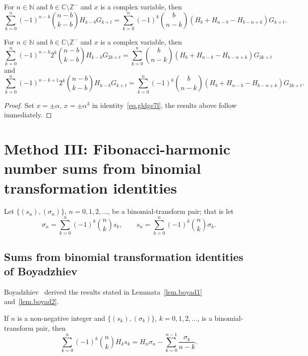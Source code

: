 \documentclass[12pt,reqno]{article}
\begin{document}
	\begin{theorem}
	For $n\in \mathbb{N}$ and $b\in \mathbb{C}\setminus\mathbb{Z}^{-}$ and $x$ is a complex variable, then
	\begin{equation}\label{today56}
	\sum_{k=0}^n (-1)^{n-k} \binom{n-b}{k-b} H_{k-b} G_{k+t} = \sum_{k=0}^n (-1)^k \binom{b}{n-k} \left(H_b + H_{n-b} - H_{b-n+k}\right)G_{k+t}.
	\end{equation}
	\end{theorem}
	\begin{theorem}
	For $n\in \mathbb{N}$ and $b\in \mathbb{C}\setminus\mathbb{Z}^{-}$ and $x$ is a complex variable, then
	\begin{equation}\label{today57}
	\sum_{k=0}^n (-1)^{n-k} 2^k \binom{n-b}{k-b} H_{k-b} G_{2k+t} = \sum_{k=0}^n \binom{b}{n-k} \left(H_b+H_{n-b}-H_{b-n+k}\right)G_{3k+t}
	\end{equation}
	and
	\begin{equation}\label{today58}
	\sum_{k=0}^n (-1)^{n-k+1} 2^k \binom{n-b}{k-b} H_{k-b} G_{k+t} = \sum_{k=0}^n (-1)^k \binom{b}{n-k}\left(H_b+H_{n-b}-H_{b-n+k}\right)G_{3k+t}.
	\end{equation}
	\end{theorem}
	\begin{proof}
	Set $x=\pm\alpha$, $x=\pm\alpha^3$ in identity~\eqref{eq.gldge7l}, the results above follow immediately.
	\end{proof}
	

	\section{Method III: Fibonacci-harmonic number sums from binomial transformation identities}
	
	
	Let $\{(s_n),(\sigma_n)\}$, $n=0,1,2,\dots$, be a binomial-transform pair; that is let
	\begin{equation*}
	\sigma_n = \sum_{k = 0}^n ( - 1)^k \binom{{n}}{k} s_k, \qquad s_n = \sum_{k = 0}^n ( - 1)^k \binom{{n}}{k}\sigma_k.
	\end{equation*}
	
	\subsection{Sums from binomial transformation identities of Boyadzhiev}
	
	Boyadzhiev~\cite{boyadzhiev16} derived the results stated in Lemmata~\ref{lem.boyad1} and~\ref{lem.boyad2}.
	
	\begin{lemma}\label{lem.boyad1}
		If $n$ is a non-negative integer and $\{(s_k),(\sigma_k)\}$, $k=0,1,2,\dots$, is a binomial-transform pair, then
		\begin{equation}\label{boyad1}
			\sum_{k = 0}^n {( - 1)^k \binom{{n}}{k}H_k s _k } = H_n \sigma_n - \sum_{k = 0}^{n - 1} {\frac{{\sigma_k }}{{n - k}}}.
		\end{equation}
	\end{lemma}
	
\end{document}
